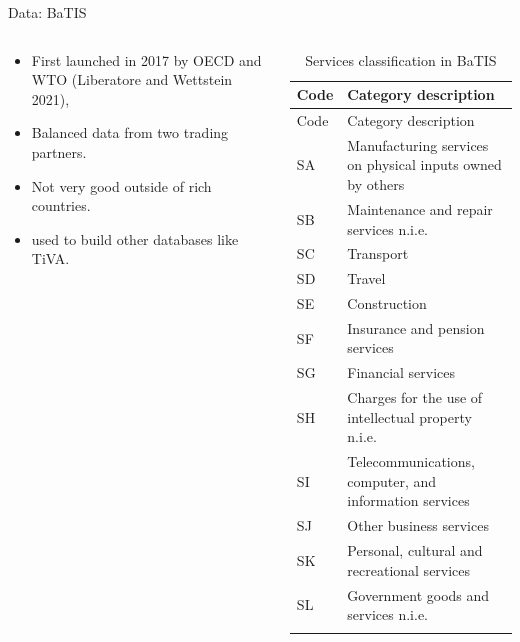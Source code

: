 \documentclass[
  ignorenonframetext,
]{beamer}
\begin{document}
\begin{frame}{Data: BaTIS}
\label{data-batis}
\begin{columns}[T]
\begin{column}{0.47\textwidth}
\begin{itemize}
\item
  First launched in 2017 by OECD and WTO (Liberatore and Wettstein
  2021),
\item
  Balanced data from two trading partners.
\item
  Not very good outside of rich countries.
\item
  used to build other databases like TiVA.
\end{itemize}
\end{column}

\begin{column}{0.47\textwidth}
\begin{longtable}[]{@{}ll@{}}
\caption{Services classification in BaTIS}\label{tbl-1}\tabularnewline
\toprule\noalign{}
Code & Category description \\
\midrule\noalign{}
\endfirsthead
\toprule\noalign{}
Code & Category description \\
\midrule\noalign{}
\endhead
SA & Manufacturing services on physical inputs owned by others \\
SB & Maintenance and repair services n.i.e. \\
SC & Transport \\
SD & Travel \\
SE & Construction \\
SF & Insurance and pension services \\
SG & Financial services \\
SH & Charges for the use of intellectual property n.i.e. \\
SI & Telecommunications, computer, and information services \\
SJ & Other business services \\
SK & Personal, cultural and recreational services \\
SL & Government goods and services n.i.e. \\
\bottomrule\noalign{}
\end{longtable}
\end{column}
\end{columns}
\end{frame}
\end{document}
